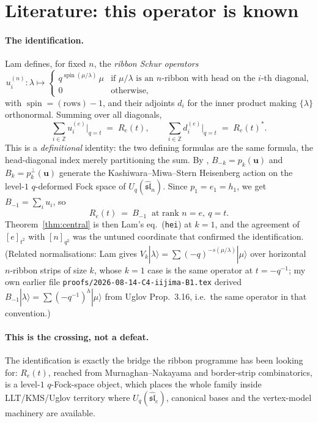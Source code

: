 \documentclass[11pt]{article}
\theoremstyle{definition}
\DeclareMathOperator{\spin}{spin}
\newcommand{\Z}{\mathbb{Z}}
\begin{document}
\section{Literature: this operator is known}\label{sec:lit}

\paragraph{The identification.}
Lam \cite[\S2]{Lam0409463} defines, for fixed $n$, the \emph{ribbon Schur
operators}
\[
  u_i^{(n)}:\lambda\longmapsto
  \begin{cases} q^{\spin(\mu/\lambda)}\,\mu & \text{if $\mu/\lambda$ is an
  $n$-ribbon with head on the $i$-th diagonal,}\\ 0 & \text{otherwise,}\end{cases}
\]
with $\spin=(\text{rows})-1$, and their adjoints $d_i$ for the inner product making
$\{\lambda\}$ orthonormal.  Summing over all diagonals,
\[
   \sum_{i\in\Z}u_i^{(e)}\Big|_{q=t}\;=\;R_e(t),\qquad
   \sum_{i\in\Z}d_i^{(e)}\Big|_{q=t}\;=\;R_e(t)^{*}.
\]
This is a \emph{definitional} identity: the two defining formulas are the same
formula, the head-diagonal index merely partitioning the sum.  By
\cite[Cor.~\texttt{cor:KMS}]{Lam0409463}, $B_{-k}=p_k(\mathbf{u})$ and
$B_k=p_k^{\perp}(\mathbf{u})$ generate the Kashiwara--Miwa--Stern \cite{KMS}
Heisenberg action on the level-$1$ $q$-deformed Fock space of
$U_q(\widehat{\mathfrak{sl}}_n)$.  Since $p_1=e_1=h_1$, we get $B_{-1}=\sum_i u_i$, so
\[
  \boxed{\;R_e(t)\ =\ B_{-1}\ \text{ at rank }n=e,\ q=t.\;}
\]
Theorem~\ref{thm:central} is then Lam's eq.~(\texttt{hei}) at $k=1$, and the
agreement of $[e]_{t^{2}}$ with $[n]_{q^{2}}$ was the untuned coordinate that
confirmed the identification.  (Related normalisations: Lam
\cite[\texttt{prop:hor}]{Lam0310250} gives $V_k|\lambda\rangle=\sum(-q)^{-s(\mu/\lambda)}
|\mu\rangle$ over horizontal $n$-ribbon strips of size $k$, whose $k=1$ case is the
same operator at $t=-q^{-1}$; my own earlier file
\texttt{proofs/2026-08-14-C4-iijima-B1.tex} derived $B_{-1}|\lambda\rangle=
\sum(-q^{-1})^{h}|\mu\rangle$ from Uglov Prop.~3.16, i.e.\ the same operator in that
convention.)

\paragraph{This is the crossing, not a defeat.}
The identification is exactly the bridge the ribbon programme has been looking for:
$R_e(t)$, reached from Murnaghan--Nakayama and border-strip combinatorics, is a
level-$1$ $q$-Fock-space object, which places the whole family inside
LLT/KMS/Uglov territory where $U_q(\widehat{\mathfrak{sl}}_e)$, canonical bases and
the vertex-model machinery are available.
\end{document}
